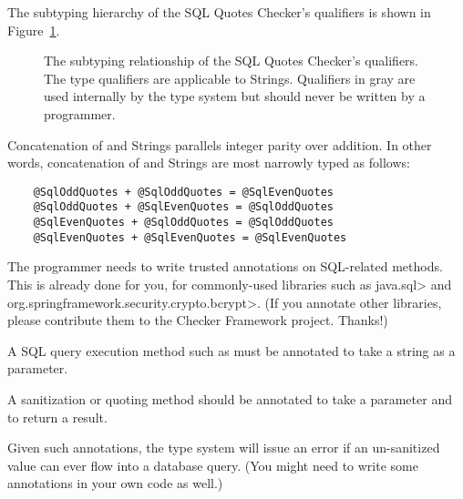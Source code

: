 The subtyping hierarchy of the SQL Quotes Checker's qualifiers is shown in
Figure~\ref{fig-sql-quotes-hierarchy}.

\begin{figure}
\caption{The subtyping relationship of the SQL Quotes Checker's qualifiers.
  The type qualifiers are applicable to Strings. Qualifiers in gray are
  used internally by the type system but should never be written by a programmer.}
\label{fig-sql-quotes-hierarchy}
\end{figure}



Concatenation of  and  Strings parallels
integer parity over addition. In other words, concatenation of 
and  Strings are most narrowly typed as follows:

\begin{Verbatim}
    @SqlOddQuotes + @SqlOddQuotes = @SqlEvenQuotes
    @SqlOddQuotes + @SqlEvenQuotes = @SqlOddQuotes
    @SqlEvenQuotes + @SqlOddQuotes = @SqlOddQuotes
    @SqlEvenQuotes + @SqlEvenQuotes = @SqlEvenQuotes
\end{Verbatim}



The programmer needs to write trusted annotations on SQL-related methods.
This is already done for you, for commonly-used libraries such as
\<java.sql> and
\<org.springframework.security.crypto.bcrypt>.
(If you annotate other libraries, please contribute them to the Checker
Framework project.  Thanks!)

A SQL query execution method such as  must be
annotated to take a  string as a parameter.

A sanitization or quoting method should be annotated to take a
 parameter and to
return a  result.

Given such annotations, the type system will issue an error if an
un-sanitized value can ever flow into a database query.
(You might need to write some annotations in your own code as well.)

